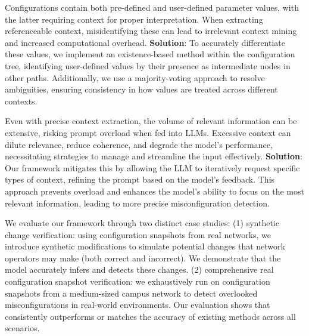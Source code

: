 Configurations contain both pre-defined and user-defined parameter values, with the latter requiring context for proper interpretation. When extracting referenceable context, misidentifying these can lead to irrelevant context mining and increased computational overhead. \textbf{Solution}: To accurately differentiate these values, we implement an existence-based method within the configuration tree, identifying user-defined values by their presence as intermediate nodes in other paths. Additionally, we use a majority-voting approach to resolve ambiguities, ensuring consistency in how values are treated across different contexts.

Even with precise context extraction, the volume of relevant information can be extensive, risking prompt overload when fed into LLMs. Excessive context can dilute relevance, reduce coherence, and degrade the model’s performance, necessitating strategies to manage and streamline the input effectively. \textbf{Solution}: Our framework mitigates this by allowing the LLM to iteratively request specific types of context, refining the prompt based on the model’s feedback. This approach prevents overload and enhances the model’s ability to focus on the most relevant information, leading to more precise misconfiguration detection.

We evaluate our framework through two distinct case studies: (1) synthetic change verification: using configuration snapshots from real networks, we introduce synthetic modifications to simulate potential changes that network operators may make (both correct and incorrect). We demonstrate that the model accurately infers and detects these changes. (2) comprehensive real configuration snapshot verification: we exhaustively run \sysname{} on configuration snapshots from a medium-sized campus network to detect overlooked misconfigurations in real-world environments. Our evaluation shows that \sysname{} consistently outperforms or matches the accuracy of existing methods across all scenarios.